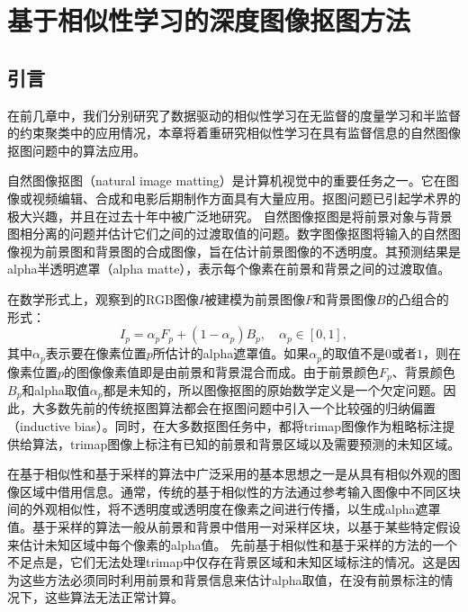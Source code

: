 \chapter{基于相似性学习的深度图像抠图方法}
\section{引言}
在前几章中，我们分别研究了数据驱动的相似性学习在无监督的度量学习和半监督的约束聚类中的应用情况，本章将着重研究相似性学习在具有监督信息的自然图像抠图问题中的算法应用。

自然图像抠图（natural image matting）是计算机视觉中的重要任务之一。它在图像或视频编辑、合成和电影后期制作方面具有大量应用\cite{wang2008image,aksoy2017designing,lutz2018alphagan,xu2017deep,samplenet}。抠图问题已引起学术界的极大兴趣，并且在过去十年中被广泛地研究。
自然图像抠图是将前景对象与背景图相分离的问题并估计它们之间的过渡取值的问题。数字图像抠图将输入的自然图像视为前景图和背景图的合成图像，旨在估计前景图像的不透明度。其预测结果是alpha半透明遮罩（alpha matte），表示每个像素在前景和背景之间的过渡取值\cite{wang2008image}。

在数学形式上，观察到的RGB图像$ I $被建模为前景图像$ F $和背景图像$ B $的凸组合的形式\cite{chuang2001bayesian,wang2008image}：
\begin{equation}
I_p = \alpha_pF_p + (1-\alpha_p)B_p, \quad \alpha_p \in [0,1],
\label{eq5:matting}
\end{equation}
其中$ \alpha_p $表示要在像素位置$ p $所估计的alpha遮罩值。如果$ \alpha_p $的取值不是$0$或者$1$，则在像素位置$p$的图像像素值即是由前景和背景混合而成。由于前景颜色$ F_p $、背景颜色$ B_p $和alpha取值$ \alpha_p $都是未知的，所以图像抠图的原始数学定义是一个欠定问题。因此，大多数先前的传统抠图算法都会在抠图问题中引入一个比较强的归纳偏置（inductive bias）。同时，在大多数抠图任务中，都将trimap图像作为粗略标注提供给算法，trimap图像上标注有已知的前景和背景区域以及需要预测的未知区域。

在基于相似性和基于采样的算法中广泛采用的基本思想之一是从具有相似外观的图像区域中借用信息。通常，传统的基于相似性的方法\cite{levin2008closed,he2010fast,chen2013knn,aksoy2017designing}通过参考输入图像中不同区块间的外观相似性，将不透明度或透明度在像素之间进行传播，以生成alpha遮罩值。基于采样的算法\cite{wang2007optimized,gastal2010shared,he2011global,feng2016cluster}一般从前景和背景中借用一对采样区块，以基于某些特定假设来估计未知区域中每个像素的alpha值。
先前基于相似性和基于采样的方法的一个不足点是，它们无法处理trimap中仅存在背景区域和未知区域标注的情况。这是因为这些方法必须同时利用前景和背景信息来估计alpha取值，在没有前景标注的情况下，这些算法无法正常计算。

